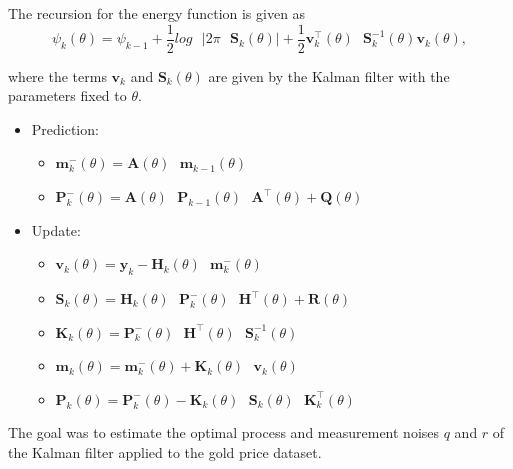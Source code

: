 \begin{theorem}
    The recursion for the energy function is given as 
    \[\psi_k(\theta) = \psi_{k-1} + \frac{1}{2}log\textbf{ }|2\pi\textbf{ 
    }\mathbf{S}_k(\theta)| + \frac{1}{2}\mathbf{v}_k^\intercal(\theta)\textbf{ }\mathbf{S}_k^{-1}(\theta)\mathbf{v}_k(\theta), \]

    where the terms $\mathbf{v}_k$ and $\mathbf{S}_k(\theta)$ are given by the Kalman filter with the parameters fixed to $\theta$.
    \begin{itemize}
        \item Prediction: 
            \begin{itemize}
                \item[] $\mathbf{m}_k^-(\theta) = \mathbf{A}(\theta)\textbf{ }\mathbf{m}_{k-1}(\theta)$
                \item[] $\mathbf{P}_k^-(\theta) = \mathbf{A}(\theta)\textbf{ }\mathbf{P}_{k-1}(\theta)\textbf{ }\mathbf{A}^\intercal(\theta)+\mathbf{Q}(\theta)$
            \end{itemize}
        \item Update: 
            \begin{itemize}
                \item[] $\mathbf{v}_k(\theta)=\mathbf{y}_k - \mathbf{H}_k(\theta)\textbf{ }\mathbf{m}_k^-(\theta)$
                \item[] $\mathbf{S}_k(\theta)= \mathbf{H}_k(\theta) \textbf{ } \mathbf{P}_k^-(\theta)\textbf{ }\mathbf{H}^\intercal(\theta)+\mathbf{R}(\theta)$
                \item[] $\mathbf{K}_k(\theta)= \mathbf{P}_k^-(\theta)\textbf{ }\mathbf{H}^\intercal(\theta)\textbf{ }\mathbf{S}_k^{-1}(\theta)$
                \item[] $\mathbf{m}_k(\theta)=\mathbf{m}_k^-(\theta)+\mathbf{K}_k(\theta)\textbf{ }\mathbf{v}_k(\theta)$
                \item[] $\mathbf{P}_k(\theta)=\mathbf{P}_k^-(\theta)- \mathbf{K}_k(\theta)\textbf{ }\mathbf{S}_k(\theta)\textbf{ }\mathbf{K}_k^\intercal(\theta)$
            \end{itemize}        
    \end{itemize}
\end{theorem}


The goal was to estimate the optimal process and measurement noises $q$ and $r$ of the Kalman filter applied to the gold price dataset. 

